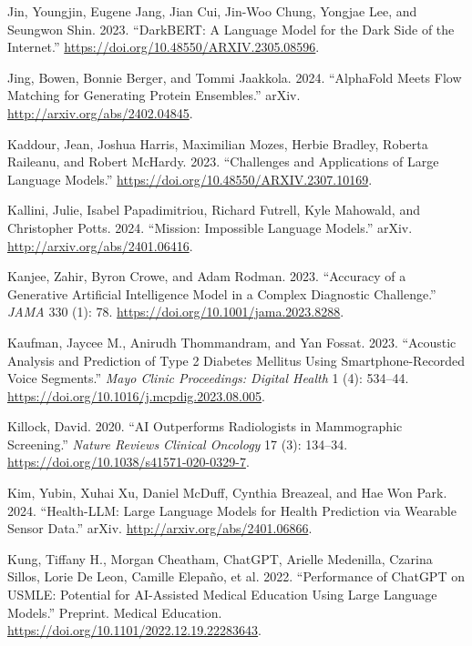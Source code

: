 \documentclass[
  Letterpaper,
]{scrbook}
\newlength{\cslhangindent}
\newenvironment{CSLReferences}[2] %
 {\begin{list}{}{%
  \setlength{\itemindent}{0pt}
  \setlength{\leftmargin}{0pt}
  \setlength{\parsep}{0pt}
  \ifodd #1
   \setlength{\leftmargin}{\cslhangindent}
   \setlength{\itemindent}{-1\cslhangindent}
  \fi
  \setlength{\itemsep}{#2\baselineskip}}}
 {\end{list}}
\begin{document}
\begin{CSLReferences}{1}{0}
Jin, Youngjin, Eugene Jang, Jian Cui, Jin-Woo Chung, Yongjae Lee, and
Seungwon Shin. 2023. {``{DarkBERT}: {A} {Language} {Model} for the
{Dark} {Side} of the {Internet}.''}
\url{https://doi.org/10.48550/ARXIV.2305.08596}.

Jing, Bowen, Bonnie Berger, and Tommi Jaakkola. 2024. {``{AlphaFold}
{Meets} {Flow} {Matching} for {Generating} {Protein} {Ensembles}.''}
arXiv. \url{http://arxiv.org/abs/2402.04845}.

Kaddour, Jean, Joshua Harris, Maximilian Mozes, Herbie Bradley, Roberta
Raileanu, and Robert McHardy. 2023. {``Challenges and {Applications} of
{Large} {Language} {Models}.''}
\url{https://doi.org/10.48550/ARXIV.2307.10169}.

Kallini, Julie, Isabel Papadimitriou, Richard Futrell, Kyle Mahowald,
and Christopher Potts. 2024. {``Mission: {Impossible} {Language}
{Models}.''} arXiv. \url{http://arxiv.org/abs/2401.06416}.

Kanjee, Zahir, Byron Crowe, and Adam Rodman. 2023. {``Accuracy of a
{Generative} {Artificial} {Intelligence} {Model} in a {Complex}
{Diagnostic} {Challenge}.''} \emph{JAMA} 330 (1): 78.
\url{https://doi.org/10.1001/jama.2023.8288}.

Kaufman, Jaycee M., Anirudh Thommandram, and Yan Fossat. 2023.
{``Acoustic {Analysis} and {Prediction} of {Type} 2 {Diabetes}
{Mellitus} {Using} {Smartphone}-{Recorded} {Voice} {Segments}.''}
\emph{Mayo Clinic Proceedings: Digital Health} 1 (4): 534--44.
\url{https://doi.org/10.1016/j.mcpdig.2023.08.005}.

Killock, David. 2020. {``{AI} Outperforms Radiologists in Mammographic
Screening.''} \emph{Nature Reviews Clinical Oncology} 17 (3): 134--34.
\url{https://doi.org/10.1038/s41571-020-0329-7}.

Kim, Yubin, Xuhai Xu, Daniel McDuff, Cynthia Breazeal, and Hae Won Park.
2024. {``Health-{LLM}: {Large} {Language} {Models} for {Health}
{Prediction} via {Wearable} {Sensor} {Data}.''} arXiv.
\url{http://arxiv.org/abs/2401.06866}.

Kung, Tiffany H., Morgan Cheatham, ChatGPT, Arielle Medenilla, Czarina
Sillos, Lorie De Leon, Camille Elepaño, et al. 2022. {``Performance of
{ChatGPT} on {USMLE}: {Potential} for {AI}-{Assisted} {Medical}
{Education} {Using} {Large} {Language} {Models}.''} Preprint. Medical
Education. \url{https://doi.org/10.1101/2022.12.19.22283643}.


\end{CSLReferences}
\end{document}
